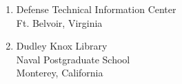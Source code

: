 \documentclass[twoside,thesis,twoadvisorsreader]{npsreport}
\begin{document}
%
\begin{enumerate}
\item Defense Technical Information Center\\Ft. Belvoir, Virginia
\item Dudley Knox Library\\Naval Postgraduate School\\Monterey, California
%
%
%
\end{enumerate}
\end{document}
